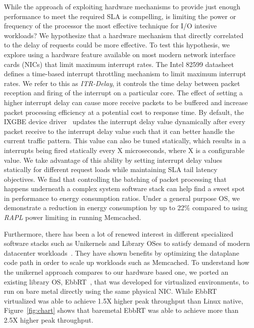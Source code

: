 \documentclass[letterpaper,twocolumn,10pt]{article}
\begin{document}
While the approach of exploiting hardware mechanisms to provide just enough performance to meet the required SLA is compelling, is limiting the power or frequency of the processor the most effective technique for I/O intesive workloads?  We hypothesize that a hardware mechanism that directly correlated to the delay of requests could be more effective.  To test this hypothesis, we explore using a hardware feature available on most modern network interface cards (NICs) that limit maximum interrupt rates. The Intel 82599 datasheet~\cite{82599} defines a time-based interrupt throttling mechanism to limit maximum interrupt rates. We refer to this as \textit{ITR-Delay}, it controls the time delay between packet reception and firing of the interrupt on a particular core. The effect of setting a higher interrupt delay can cause more receive packets to be buffered and increase packet processing efficiency at a potential cost to response time. By default, the IXGBE device driver~\cite{intel_ixgbe} updates the interrupt delay value dynamically after every packet receive to the interrupt delay value such that it can better handle the current traffic pattern. This value can also be tuned statically, which results in a interrupts being fired statically every X microseconds, where X is a configurable value. We take advantage of this ability by setting interrupt delay values statically for different request loads while maintaining SLA tail latency objectives. We find that controlling the batching of packet processing that happens underneath a complex system software stack can help find a sweet spot in performance to energy consumption ratios. Under a general purpose OS, we demonstrate a reduction in energy consumption by up to 22\% compared to using \textit{RAPL} power limiting in running Memcached.

Furthermore, there has been a lot of renewed interest in different specialized software stacks such as Unikernels and Library OSes to satisfy demand of modern datacenter workloads~\cite{unikernels, aliraza}. They have shown benefits by optimizing the dataplane code path in order to scale up workloads such as Memcached. To understand how the unikernel approach compares to our hardware based one, we ported an existing library OS, EbbRT~\cite{ebbrt}, that was developed for virtualized environments, to run on bare metal directly using the same physical NIC. While EbbRT virtualized was able to achieve 1.5X higher peak throughput than Linux native, Figure~\ref{fig:chart} shows that baremetal EbbRT was able to achieve more than 2.5X higher peak throughput.
\end{document}
